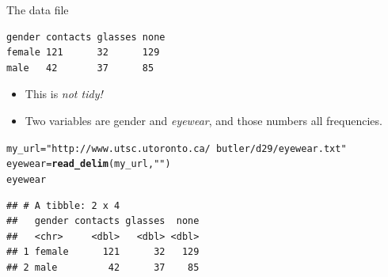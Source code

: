 \documentclass[unknownkeysallowed]{beamer}\usepackage[]{graphicx}\usepackage[]{color}
\makeatletter
\newcommand{\hlstr}[1]{\textcolor[rgb]{0.192,0.494,0.8}{#1}}%
\newcommand{\hlstd}[1]{\textcolor[rgb]{0.345,0.345,0.345}{#1}}%
\newcommand{\hlkwb}[1]{\textcolor[rgb]{0.69,0.353,0.396}{#1}}%
\newcommand{\hlkwd}[1]{\textcolor[rgb]{0.737,0.353,0.396}{\textbf{#1}}}%
\newenvironment{kframe}{%
 \def\at@end@of@kframe{}%
 \ifinner\ifhmode%
  \def\at@end@of@kframe{\end{minipage}}%
  \begin{minipage}{\columnwidth}%
 \fi\fi%
 \def\FrameCommand##1{\hskip\@totalleftmargin \hskip-\fboxsep
 \colorbox{shadecolor}{##1}\hskip-\fboxsep
     \hskip-\linewidth \hskip-\@totalleftmargin \hskip\columnwidth}%
 \MakeFramed {\advance\hsize-\width
   \@totalleftmargin\z@ \linewidth\hsize
   \@setminipage}}%
 {\par\unskip\endMakeFramed%
 \at@end@of@kframe}
\newenvironment{knitrout}{}{} %
\makeatother
\begin{document}
\begin{frame}[fragile]{The data file}
  
\begin{verbatim}
gender contacts glasses none
female 121      32      129
male   42       37      85
\end{verbatim}
  
  \begin{itemize}
  \item This is \emph{not tidy!}
  \item Two variables are gender and \emph{eyewear}, and those numbers
    all frequencies.
  \end{itemize}

\begin{knitrout}
\color{fgcolor}\begin{kframe}
\begin{alltt}
\hlstd{my_url}\hlkwb{=}\hlstr{"http://www.utsc.utoronto.ca/~butler/d29/eyewear.txt"}
\hlstd{eyewear}\hlkwb{=}\hlkwd{read_delim}\hlstd{(my_url,}\hlstr{" "}\hlstd{)}
\hlstd{eyewear}
\end{alltt}
\begin{verbatim}
## # A tibble: 2 x 4
##   gender contacts glasses  none
##   <chr>     <dbl>   <dbl> <dbl>
## 1 female      121      32   129
## 2 male         42      37    85
\end{verbatim}
\end{kframe}
\end{knitrout}
  
\end{frame}
\end{document}
